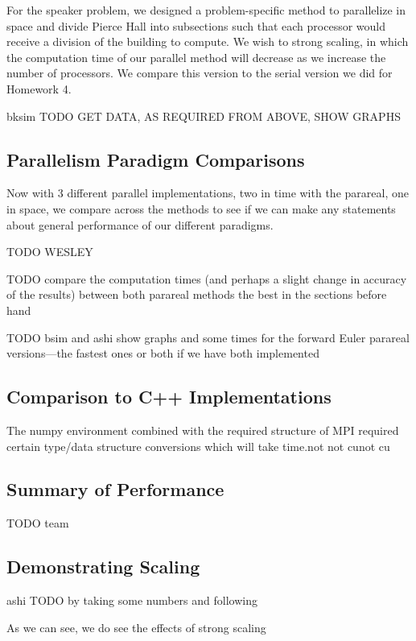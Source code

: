 \documentclass[letterpaper,12pt]{article}
\begin{document}
For the speaker problem, we designed a problem-specific method to parallelize in space and divide Pierce Hall into subsections such that each processor would receive a division of the building to compute. We wish to strong scaling, in which the computation time of our parallel method will decrease as we increase the number of processors. We compare this version to the serial version we did for Homework 4.

bksim TODO GET DATA, AS REQUIRED FROM ABOVE, SHOW GRAPHS

\subsection{Parallelism Paradigm Comparisons}

Now with 3 different parallel implementations, two in time with the parareal, one in space, we compare across the methods to see if we can make any statements about general performance of our different paradigms.

TODO WESLEY

TODO compare the computation times (and perhaps a slight change in accuracy of the results) between both parareal methods the best in the sections before hand

TODO bsim and ashi show graphs and some times for the forward Euler parareal
versions---the fastest ones or both if we have both implemented

\subsection{Comparison to C++ Implementations}

The numpy environment combined with the required structure of MPI required
certain type/data structure conversions which will take time.not not cunot cu

\subsection{Summary of Performance}

TODO team

\subsection{Demonstrating Scaling}

ashi TODO by taking some numbers and following

As we can see, we do see the effects of strong scaling
\end{document}
